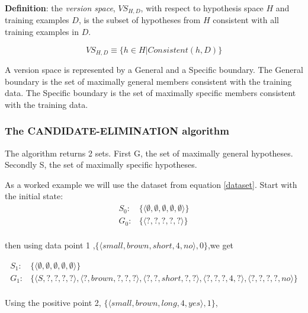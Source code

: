 \documentclass[10pt,a4paper]{article}
\begin{document}
\textbf{Definition}: the \emph{version space}, $VS_{H,D}$, with respect to hypothesis space $H$ and training examples $D$, is the subset of hypotheses from $H$ consistent with all training examples in $D$.

\begin{equation}
VS_{H,D} \equiv \{h \in H | Consistent(h,D)\}
\end{equation}

A version space is represented by a General and a Specific boundary. The General boundary is the set of maximally general members consistent with the training data. The Specific boundary is the set of maximally specific members consistent with the training data.  

\citep{stan,Riedmiller}

\subsubsection{The CANDIDATE-ELIMINATION algorithm}

The algorithm returns 2 sets. First G, the set of maximally general hypotheses. Secondly S, the set of maximally specific hypotheses. 

As a worked example we will use the dataset from equation \eqref{dataset}. Start with the initial state:
\begin{equation}
\begin{split}
S_0: & \{ \langle\emptyset,\emptyset,\emptyset,\emptyset,\emptyset\rangle \} \\
G_0: & \{ \langle?,?,?,?,?\rangle \} \\
\end{split}
\end{equation}

then using data point 1 ,$\{\langle small, brown, short, 4, no\rangle, 0\}$,we get

\begin{equation}
\begin{split}
S_1: & \{ \langle\emptyset,\emptyset,\emptyset,\emptyset,\emptyset\rangle \} \\
G_1: & \{ \langle S,?,?,?,?\rangle, \langle?,brown,?,?,?\rangle, \langle?,?,short,?,?\rangle, \langle?,?,?,4,?\rangle, \langle?,?,?,?,no\rangle \} \\
\end{split}
\end{equation}

Using the positive point 2, $ \{\langle small, brown, long, 4, yes\rangle, 1\}$,
\end{document}
